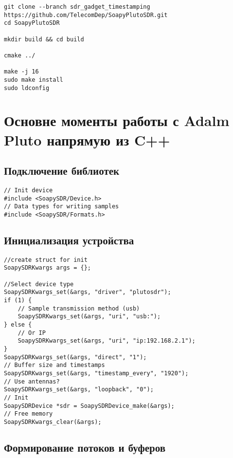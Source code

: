 \begin{lstlisting}
git clone --branch sdr_gadget_timestamping https://github.com/TelecomDep/SoapyPlutoSDR.git
cd SoapyPlutoSDR

mkdir build && cd build

cmake ../

make -j 16
sudo make install
sudo ldconfig
\end{lstlisting}

\section*{\textbf{Основне моменты работы с Adalm Pluto напрямую из C++}}

\subsection*{\textbf{Подключение библиотек}}

\begin{lstlisting}
// Init device
#include <SoapySDR/Device.h>  
// Data types for writing samples 
#include <SoapySDR/Formats.h>  
\end{lstlisting}

\subsection*{\textbf{Инициализация устройства}}

\begin{lstlisting}
//create struct for init
SoapySDRKwargs args = {};

//Select device type
SoapySDRKwargs_set(&args, "driver", "plutosdr");       
if (1) {
    // Sample transmission method (usb)
    SoapySDRKwargs_set(&args, "uri", "usb:");           
} else {
    // Or IP
    SoapySDRKwargs_set(&args, "uri", "ip:192.168.2.1"); 
}
SoapySDRKwargs_set(&args, "direct", "1");
// Buffer size and timestamps              
SoapySDRKwargs_set(&args, "timestamp_every", "1920");  
// Use antennas?
SoapySDRKwargs_set(&args, "loopback", "0");
// Init             
SoapySDRDevice *sdr = SoapySDRDevice_make(&args);    
// Free memory   
SoapySDRKwargs_clear(&args);
\end{lstlisting}

\subsection*{\textbf{Формирование потоков и буферов}}

